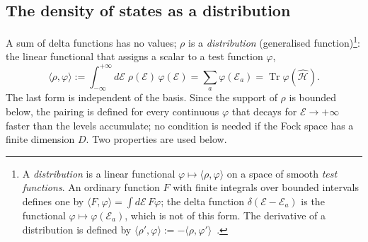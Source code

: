 \documentclass[10pt,a4paper]{article}
\theoremstyle{plain}
\newcommand{\Tr}{\operatorname{Tr}}
\newcommand{\enrg}{\mathcal{E}}  %
\begin{document}
\subsection{The density of states as a distribution}
\label{sec:filt_dist}

A sum of delta functions has no values; $\rho$ is a \emph{distribution}
(generalised function)\footnote{\label{footnote:distribution}
A \emph{distribution} is a linear functional
$\varphi\mapsto\langle\rho,\varphi\rangle$ on a space of smooth \emph{test
functions}. An ordinary function $F$ with finite integrals over bounded
intervals defines one by $\langle F,\varphi\rangle=\int d\enrg\,F\varphi$;
the delta function $\delta(\enrg-\enrg_a)$ is the functional
$\varphi\mapsto\varphi(\enrg_a)$, which is not of this form. The derivative
of a distribution is defined by
$\langle\rho',\varphi\rangle:=-\langle\rho,\varphi'\rangle$~\cite{GelfandShilov,Zemanian}.}:
the linear functional that assigns a scalar to a test function $\varphi$,
\begin{equation}\label{eq:filt_pairing}
  \langle \rho,\varphi\rangle:=\int_{-\infty}^{+\infty} d\enrg\;\rho(\enrg)\,\varphi(\enrg)
  =\sum_a\varphi(\enrg_a)=\Tr\varphi(\hat{\mathcal H}) .
\end{equation}
The last form is independent of the basis. Since the support of $\rho$ is
bounded below, the pairing is defined for every continuous $\varphi$ that
decays for $\enrg\to+\infty$ faster than the levels accumulate; no condition
is needed if the Fock space has a finite dimension $D$. Two properties are
used below.
\end{document}
